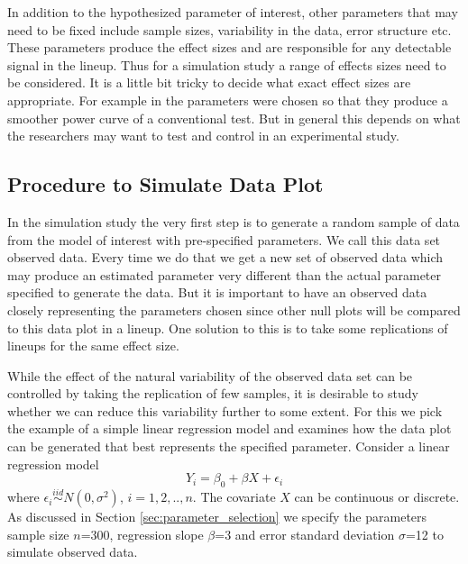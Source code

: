\documentclass[11pt]{article}
\begin{document}
In addition to the hypothesized parameter of interest, other parameters that may need to be fixed include sample sizes, variability in the data, error structure etc. These parameters produce the effect sizes and are responsible for any detectable signal in the lineup. Thus for a simulation study a range of effects sizes need to be considered. It is a little bit tricky to decide what exact effect sizes are appropriate. For example in \cite{majumder:2013} the parameters were chosen so that they produce a smoother power curve of a conventional test. But in general this depends on what the researchers may want to test and control in an experimental study.


\subsection{Procedure to Simulate Data Plot} \label{sec:simulate_plot} In the simulation study the very first step is to generate a random sample of data from the model of interest with pre-specified parameters. We call this data set observed data. Every time we do that we get a new set of observed data which may produce an estimated parameter very different than the actual parameter specified to generate the data. But it is important to have an observed data closely representing the parameters chosen since other null plots will be compared to this data plot in a lineup. One solution to this is to take some replications of lineups for the same effect size. 

While the effect of the natural variability of the observed data set can be controlled by taking the replication of few samples, it is desirable to study whether we can reduce this variability further to some extent. For this we pick the example of a simple linear regression model and examines how the data plot can be generated that best represents the specified parameter.  Consider a linear regression model 
\begin{equation} \label{eqn:turk_model} 
Y_i = \beta_0 + \beta X  + \epsilon_i 
\end{equation}
where $\epsilon_i \stackrel{iid}{ \sim } N(0,\sigma^2)$, $i=1,2, .., n$. The covariate $X$ can be continuous or discrete. As discussed in Section \ref{sec:parameter_selection} we specify the parameters sample size $n$=300, regression slope $\beta$=3 and error standard deviation $\sigma$=12 to simulate observed data.
\end{document}
